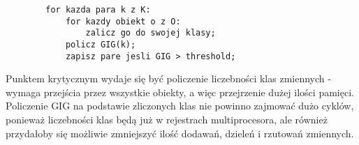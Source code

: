 \documentclass[a4paper]{article}
\begin{document}
    \begin{lstlisting}
        for kazda para k z K:
            for kazdy obiekt o z O:
                zalicz go do swojej klasy;
            policz GIG(k);
            zapisz pare jesli GIG > threshold;
    \end{lstlisting}

    Punktem krytycznym wydaje się być policzenie liczebności klas zmiennych - wymaga przejścia przez wszystkie obiekty, a więc przejrzenie dużej ilości pamięci. Policzenie GIG na podstawie zliczonych klas nie powinno zajmować dużo cyklów, ponieważ liczebności klas będą już w rejestrach multiprocesora, ale również przydałoby się możliwie zmniejszyć ilość dodawań, dzieleń i rzutowań zmiennych.
\end{document}
